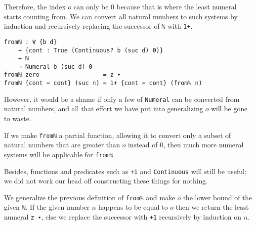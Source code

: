 \documentclass[\main/thesis.tex]{subfiles}
\begin{document}
Therefore, the index $o$ can only be $0$ because that is where the least
numeral starts counting from. We can convert all natural numbers to such systems
by induction and recursively replacing the successor of \lstinline|ℕ| with
\lstinline|1+|.

\begin{lstlisting}
fromℕ : ∀ {b d}
    → {cont : True (Continuous? b (suc d) 0)}
    → ℕ
    → Numeral b (suc d) 0
fromℕ zero                  = z ∙
fromℕ {cont = cont} (suc n) = 1+ {cont = cont} (fromℕ n)
\end{lstlisting}

However, it would be a shame if only a few of \lstinline|Numeral| can be
converted from natural numbers, and all that effort we have put into
generalizing $ o $ will be gone to waste.

If we make \lstinline|fromℕ| a partial function, allowing it to convert only
a subset of natural numbers that are greater than $ o $ instead of $ 0 $,
then much more numeral systems will be applicable for \lstinline|fromℕ|.

\begin{center}
    \begin{adjustbox}{max width=\textwidth}
    \end{adjustbox}
\end{center}

Besides, functions and predicates such as \lstinline|+1| and
\lstinline|Continuous| will still be useful;
we did not work our head off constructing these things for nothing.

We generalize the previous definition of \lstinline|fromℕ| and make $ o $ the
lower bound of the given \lstinline|ℕ|.
If the given number $ n $ happens to be equal to $ o $ then we return the least
numeral \lstinline|z ∙|, else we replace the successor with \lstinline|+1|
recursively by induction on $ n $.
\end{document}

